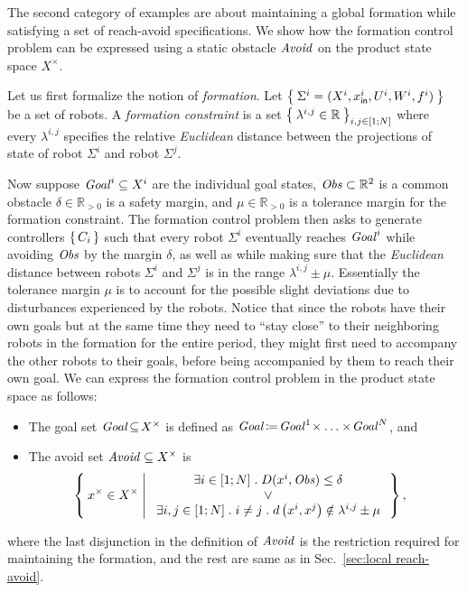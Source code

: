 The second category of examples are about maintaining a global formation while satisfying a set of reach-avoid specifications.
We show how the formation control problem can be expressed using a static obstacle $\mathit{Avoid}$ on the product state space $X^\times$.

Let us first formalize the notion of \emph{formation}.
Let $\Set{\Sigma^i=(X^i,x_{\mathsf{in}}^i,U^i,W^i,f^i)}$ be a set of robots.
A \emph{formation constraint} is a set $\Set{\lambda^{i,j}\in \mathbb{R}}_{i,j\in [1;N]}$ where every $\lambda^{i,j}$ specifies the relative \emph{Euclidean} 
distance between the projections of state of robot $\Sigma^i$ and robot $\Sigma^j$.%

Now suppose $\mathit{Goal}^i\subseteq X^i$ are the individual goal states, $\mathit{Obs}\subset \mathbb{R}^2$ is a common obstacle %
$\delta \in \mathbb{R}_{>0}$ is a safety margin, and $\mu\in \mathbb{R}_{>0}$ is a tolerance margin for the formation constraint.
The formation control problem then asks to generate controllers $\set{C_i}$ such that every robot $\Sigma^i$ eventually reaches $\mathit{Goal}^i$ while avoiding $\mathit{Obs}$ 
by the margin $\delta$, as well as while making sure that the \emph{Euclidean} distance between robots $\Sigma^i$ and $\Sigma^j$ is in the range $\lambda^{i,j} \pm \mu$.
Essentially the tolerance margin $\mu$ is to account for the possible slight deviations due to disturbances experienced by the robots. 
Notice that since the robots have their own goals but at the same time they need to ``stay close'' to their neighboring robots in the formation for the entire period, 
they might first need to accompany the other robots to their goals, before being accompanied by them to reach their own goal.
%
We can express the formation control problem in the product state space as follows:
\begin{itemize}
	\item The goal set $\mathit{Goal}\!\subseteq\! X^\times$ is defined as $\mathit{Goal}\!\coloneqq\! \mathit{Goal}^1\!\times \ldots \times\! \mathit{Goal}^N$, and
	\item The avoid set $\mathit{Avoid}\subseteq X^\times$ is 
		\begin{align}
			&\Set{ x^\times\in X^\times | 
				\begin{array}{c}
					\exists i\in [1;N]\;.\; D(x^i,\mathit{Obs}) \leq \delta\\
					\vee\\
					\exists i,j\in [1;N]\;.\; i\neq j\;.\; d\left(x^i,x^j\right)\notin\lambda^{i,j}\pm \mu
			\end{array}},					
		\end{align}
\end{itemize}
where the last disjunction in the definition of $\mathit{Avoid}$ is the restriction required for maintaining the formation, and the rest are 
same as in Sec.~\ref{sec:local reach-avoid}.

